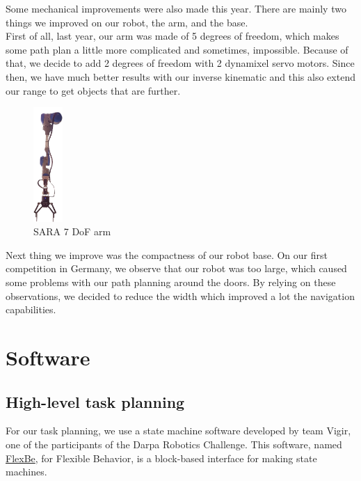\documentclass[runningheads,a4paper]{llncs}
\begin{document}
\tab Some mechanical improvements were also made this year. There are mainly two things we improved on our robot, the arm, and the base.\\

First of all, last year, our arm was made of 5 degrees of freedom, which makes some path plan a little more complicated and sometimes, impossible. Because of that, we decide to add 2 degrees of freedom with 2 dynamixel servo motors. Since then, we have much better results with our inverse kinematic and this also extend our range to get objects that are further.\\
\begin{figure}
	\centering
	\includegraphics[width=0.10\textwidth]{images/arm.png}
	\caption{SARA 7 DoF arm}
\end{figure}

Next thing we improve was the compactness of our robot base. On our first competition in Germany, we observe that our robot was too large, which caused some problems with our path planning around the doors. By relying on these observations, we decided to reduce the width which improved a lot the navigation capabilities. \\
\newpage
\section{Software}

\subsection{High-level task planning}
\tab For our task planning, we use a state machine software developed by team Vigir, one of the participants of the Darpa Robotics Challenge. This software, named \href{http://philserver.bplaced.net/fbe/index.php}{FlexBe}\cite{schillinger2016flexbe}, for Flexible Behavior, is a block-based interface for making state machines.\\
\end{document}
